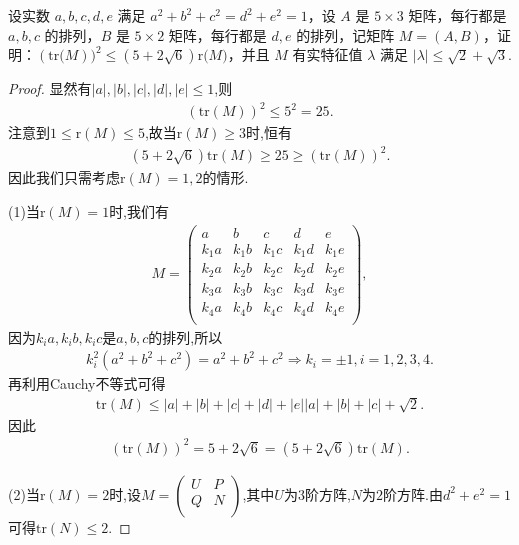 \documentclass[../../main.tex]{subfiles}
\begin{document}
\begin{example}
设实数 $a,b,c,d,e$ 满足 $a^2 + b^2 + c^2 = d^2 + e^2 = 1$，设 $A$ 是 $5 \times 3$ 矩阵，每行都是 $a,b,c$ 的排列，$B$ 是 $5 \times 2$ 矩阵，每行都是 $d,e$ 的排列，记矩阵 $M = (A,B)$，证明：$(\mathrm{tr(}M))^2\leqslant \left( 5+2\sqrt{6} \right) \mathrm{r(}M)$，并且 $M$ 有实特征值 $\lambda$ 满足 $|\lambda| \leq \sqrt{2} + \sqrt{3}$.
\end{example}
\begin{proof}
显然有$|a|,|b|,|c|,|d|,|e|\leqslant 1$,则
\begin{align*}
(\mathrm{tr}(M))^2\leqslant 5^2=25.
\end{align*}
注意到$1\leqslant \mathrm{r}(M) \leqslant 5$,故当$\mathrm{r}(M) \geqslant 3$时,恒有
\begin{align*}
\left( 5+2\sqrt{6} \right) \mathrm{tr}(M)\geqslant 25\geqslant (\mathrm{tr}(M))^2.
\end{align*}
因此我们只需考虑$\mathrm{r}(M) =1,2$的情形.

(1)当$\mathrm{r}(M) =1$时,我们有
\begin{align*}
M=\begin{pmatrix}
a&		b&		c&		d&		e\\
k_1a&		k_1b&		k_1c&		k_1d&		k_1e\\
k_2a&		k_2b&		k_2c&		k_2d&		k_2e\\
k_3a&		k_3b&		k_3c&		k_3d&		k_3e\\
k_4a&		k_4b&		k_4c&		k_4d&		k_4e\\
\end{pmatrix},
\end{align*}
因为$k_ia,k_ib,k_ic$是$a,b,c$的排列,所以
\begin{align*}
k_{i}^{2}\left( a^2+b^2+c^2 \right) =a^2+b^2+c^2\Rightarrow k_i=\pm 1,i=1,2,3,4.
\end{align*}
再利用Cauchy不等式可得
\begin{align*}
\mathrm{tr}\left( M \right) \leqslant |a|+|b|+|c|+|d|+|e| |a|+|b|+|c|+\sqrt{2}.
\end{align*}
因此
\begin{align*}
\left( \mathrm{tr}\left( M \right) \right) ^2=5+2\sqrt{6}=\left( 5+2\sqrt{6} \right) \mathrm{tr}(M).
\end{align*}

(2)当$\mathrm{r}(M) =2$时,设$M=\begin{pmatrix}
U&		P\\
Q&		N\\
\end{pmatrix}$,其中$U$为$3$阶方阵,$N$为$2$阶方阵.由$d^2+e^2=1$可得$\mathrm{tr}(N) \leqslant 2$.


\end{proof}
\end{document}
